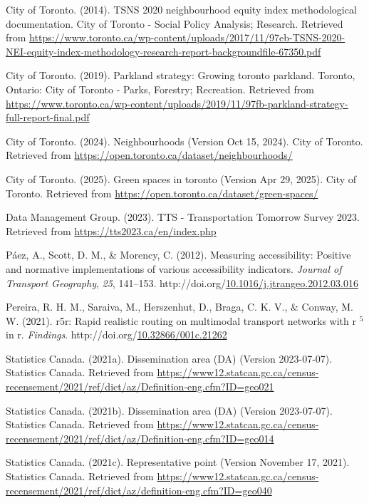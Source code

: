 \documentclass[
11pt, %
oneside, %
english, %
singlespacing, %
]{macthesis} %
\newlength{\cslhangindent}
\newenvironment{CSLReferences}[2] %
{\begin{list}{}{%
	\setlength{\itemindent}{0pt}
	\setlength{\leftmargin}{0pt}
	\setlength{\parsep}{0pt}
	\ifodd #1
	\setlength{\leftmargin}{\cslhangindent}
	\setlength{\itemindent}{-1\cslhangindent}
	\fi
	\setlength{\itemsep}{#2\baselineskip}}}
{\end{list}}
\begin{document}
\label{refs}
\begin{CSLReferences}{1}{0}
City of Toronto. (2014). TSNS 2020 neighbourhood equity index methodological documentation. City of Toronto - Social Policy Analysis; Research. Retrieved from \url{https://www.toronto.ca/wp-content/uploads/2017/11/97eb-TSNS-2020-NEI-equity-index-methodology-research-report-backgroundfile-67350.pdf}

City of Toronto. (2019). Parkland strategy: Growing toronto parkland. Toronto, Ontario: City of Toronto - Parks, Forestry; Recreation. Retrieved from \url{https://www.toronto.ca/wp-content/uploads/2019/11/97fb-parkland-strategy-full-report-final.pdf}

City of Toronto. (2024). Neighbourhoods (Version Oct 15, 2024). City of Toronto. Retrieved from \url{https://open.toronto.ca/dataset/neighbourhoods/}

City of Toronto. (2025). Green spaces in toronto (Version Apr 29, 2025). City of Toronto. Retrieved from \url{https://open.toronto.ca/dataset/green-spaces/}

Data Management Group. (2023). {TTS} - {Transportation} {Tomorrow} {Survey} 2023. Retrieved from \url{https://tts2023.ca/en/index.php}

Páez, A., Scott, D. M., \& Morency, C. (2012). Measuring accessibility: Positive and normative implementations of various accessibility indicators. \emph{Journal of Transport Geography}, \emph{25}, 141--153. http://doi.org/\href{https://doi.org/10.1016/j.jtrangeo.2012.03.016}{10.1016/j.jtrangeo.2012.03.016}

Pereira, R. H. M., Saraiva, M., Herszenhut, D., Braga, C. K. V., \& Conway, M. W. (2021). r5r: Rapid realistic routing on multimodal transport networks with r \(^{\textrm{5}}\) in r. \emph{Findings}. http://doi.org/\href{https://doi.org/10.32866/001c.21262}{10.32866/001c.21262}

Statistics Canada. (2021a). Dissemination area (DA) (Version 2023-07-07). Statistics Canada. Retrieved from \url{https://www12.statcan.gc.ca/census-recensement/2021/ref/dict/az/Definition-eng.cfm?ID=geo021}

Statistics Canada. (2021b). Dissemination area (DA) (Version 2023-07-07). Statistics Canada. Retrieved from \url{https://www12.statcan.gc.ca/census-recensement/2021/ref/dict/az/Definition-eng.cfm?ID=geo014}

Statistics Canada. (2021c). Representative point (Version November 17, 2021). Statistics Canada. Retrieved from \url{https://www12.statcan.gc.ca/census-recensement/2021/ref/dict/az/definition-eng.cfm?ID=geo040}

\end{CSLReferences}
\end{document}
